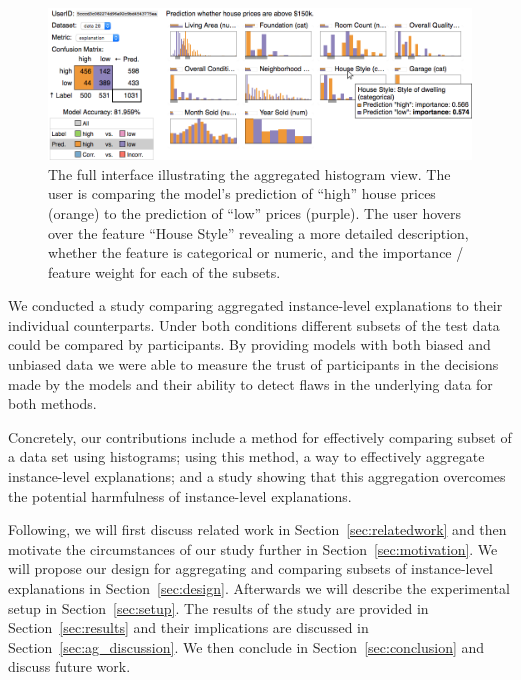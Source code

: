 \begin{figure}[t]
\centering
\includegraphics[width=\linewidth]{aggexplain/full_histogram}
\caption[The full interface illustrating the aggregated histogram view.]{
The full interface illustrating the aggregated histogram view.
The user is comparing the model's prediction of ``high'' house prices (orange) to the prediction of ``low'' prices (purple).
The user hovers over the feature ``House Style'' revealing a more detailed description, whether the feature is categorical or numeric, and the importance / feature weight for each of the subsets.
}
\label{figs:full_hist_view}
\end{figure}

We conducted a study comparing aggregated instance-level explanations to their individual counterparts.
Under both conditions different subsets of the test data could be compared by participants.
By providing models with both biased and unbiased data we were able to measure the trust of participants in the decisions made by the models and their ability to detect flaws in the underlying data for both methods.

Concretely, our contributions include a method for effectively comparing subset of a data set using histograms; using this method, a way to effectively aggregate instance-level explanations; and a study showing that this aggregation overcomes the potential harmfulness of instance-level explanations.

Following, we will first discuss related work in Section~\ref{sec:relatedwork} and then motivate the circumstances of our study further in Section~\ref{sec:motivation}.
We will propose our design for aggregating and comparing subsets of instance-level explanations in Section~\ref{sec:design}.
Afterwards we will describe the experimental setup in Section~\ref{sec:setup}.
The results of the study are provided in Section~\ref{sec:results} and their implications are discussed in Section~\ref{sec:ag_discussion}.
We then conclude in Section~\ref{sec:conclusion} and discuss future work.
